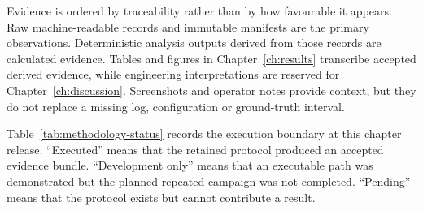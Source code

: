 Evidence is ordered by traceability rather than by how favourable it appears.
Raw machine-readable records and immutable manifests are the primary
observations. Deterministic analysis outputs derived from those records are
calculated evidence. Tables and figures in Chapter~\ref{ch:results} transcribe
accepted derived evidence, while engineering interpretations are reserved for
Chapter~\ref{ch:discussion}. Screenshots and operator notes provide context,
but they do not replace a missing log, configuration or ground-truth interval.

Table~\ref{tab:methodology-status} records the execution boundary at this
chapter release. ``Executed'' means that the retained protocol produced an
accepted evidence bundle. ``Development only'' means that an executable path
was demonstrated but the planned repeated campaign was not completed.
``Pending'' means that the protocol exists but cannot contribute a result.

